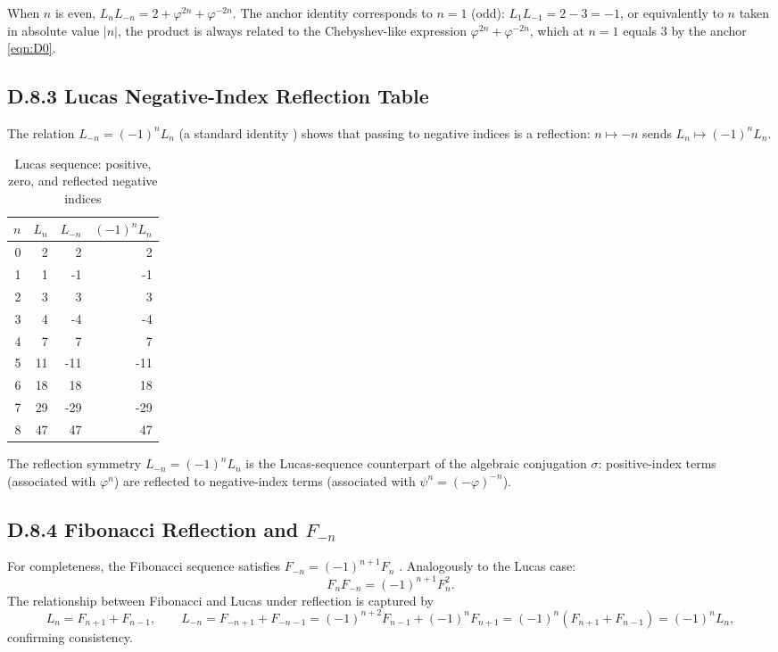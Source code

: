 \begin{remark}
When $n$ is even, $L_n L_{-n} = 2 + \varphi^{2n}+\varphi^{-2n}$.
The anchor identity corresponds to $n=1$ (odd): $L_1 L_{-1} = 2-3 = -1$, or
equivalently to $n$ taken in absolute value $|n|$, the product is always
related to the Chebyshev-like expression $\varphi^{2n}+\varphi^{-2n}$,
which at $n=1$ equals $3$ by the anchor \eqref{eqn:D0}.
\end{remark}

\subsection*{D.8.3  Lucas Negative-Index Reflection Table}

The relation $L_{-n} = (-1)^n L_n$ (a standard identity \cite{vajda_fib_lucas,ballot2023lucas})
shows that passing to negative indices is a reflection: $n \mapsto -n$ sends
$L_n \mapsto (-1)^n L_n$.

\begin{table}[h]
\centering
\caption{Lucas sequence: positive, zero, and reflected negative indices}
\begin{tabular}{rrrr}
\toprule
$n$ & $L_n$ & $L_{-n}$ & $(-1)^n L_n$ \\
\midrule
0 & 2  &  2 &  2 \\
1 & 1  & -1 & -1 \\
2 & 3  &  3 &  3 \\
3 & 4  & -4 & -4 \\
4 & 7  &  7 &  7 \\
5 & 11 & -11 & -11 \\
6 & 18 & 18 &  18 \\
7 & 29 & -29 & -29 \\
8 & 47 & 47 &  47 \\
\bottomrule
\end{tabular}
\end{table}

\noindent The reflection symmetry $L_{-n} = (-1)^n L_n$ is the Lucas-sequence
counterpart of the algebraic conjugation $\sigma$: positive-index terms
(associated with $\varphi^n$) are reflected to negative-index terms
(associated with $\psi^n = (-\varphi)^{-n}$).

\subsection*{D.8.4  Fibonacci Reflection and $F_{-n}$}

For completeness, the Fibonacci sequence satisfies $F_{-n} = (-1)^{n+1} F_n$
\cite{koshy_fib_lucas}.  Analogously to the Lucas case:
\[
  F_n F_{-n} = (-1)^{n+1} F_n^2.
\]
The relationship between Fibonacci and Lucas under reflection is captured by
\[
  L_n = F_{n+1} + F_{n-1}, \qquad
  L_{-n} = F_{-n+1} + F_{-n-1} = (-1)^{n+2}F_{n-1} + (-1)^n F_{n+1}
  = (-1)^n(F_{n+1} + F_{n-1}) = (-1)^n L_n,
\]
confirming consistency.

